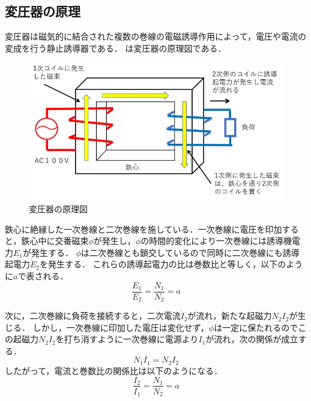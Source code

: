 \subsection{変圧器の原理\cite{jknv}}
変圧器は磁気的に結合された複数の巻線の電磁誘導作用によって，電圧や電流の変成を行う静止誘導器である．
は変圧器の原理図である．
\begin{figure}[h]
	\centering
	\includegraphics[scale=0.75]{./fig/Transformer-structure-and-principle.jpg}
	\caption{変圧器の原理図\cite{genri}}
	\label{fig:genri}
\end{figure}

鉄心に絶縁した一次巻線と二次巻線を施している．一次巻線に電圧を印加すると，鉄心中に交番磁束$\dot{\phi}$が発生し，$\dot{\phi}$の時間的変化により一次巻線には誘導機電力$\dot{E}_{1}$が発生する．
$\dot{\phi}$は二次巻線とも鎖交しているので同時に二次巻線にも誘導起電力$\dot{E}_{2}$を発生する．
これらの誘導起電力の比は巻数比と等しく，以下のように$a$で表される．
\begin{equation}
	\frac{E_{1}}{E_{2}}=\frac{N_{1}}{N_{2}}=a
\end{equation}

次に，二次巻線に負荷を接続すると，二次電流$\dot{I}_{2}$が流れ，新たな起磁力$N_{2}I_{2}$が生じる．
しかし，一次巻線に印加した電圧は変化せず，$\dot{\phi}$は一定に保たれるのでこの起磁力$N_{2}I_{2}$を打ち消すように一次巻線に電源より$\dot{I}_{1}$が流れ，次の関係が成立する．
\begin{equation}
	N_{1}I_{1}=N_{2}I_{2}
\end{equation}
したがって，電流と巻数比の関係比は以下のようになる．
\begin{equation}
	\frac{I_{2}}{I_{1}}=\frac{N_{1}}{N_{2}}=a
\end{equation}


